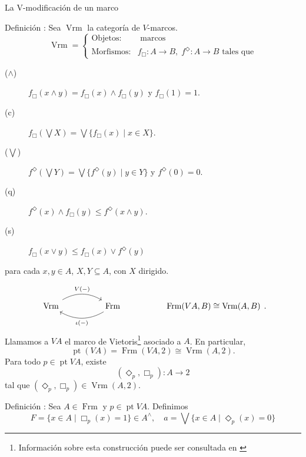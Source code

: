 \documentclass[compress,12pt]{beamer}
\DeclareMathOperator{\pt}{pt}
\DeclareMathOperator{\Vrm}{Vrm}
\DeclareMathOperator{\Frm}{Frm}
\begin{document}
\begin{frame}{La V-modificación de un marco}
\begin{block}{Definición \citep{JohnstoneVietorisMonad}:}
Sea $\Vrm$ la categoría de $V$-marcos. 
\[
\Vrm=
\left\{
\begin{array}{ll}
\text{Objetos:} & \text{ marcos} 
\\[1mm]
\text{Morfismos:} & f_\Box\colon A\to B, \; f^\Diamond\colon A\to B \text{ tales que}
\end{array}
\right.
\]
\begin{description}
\item[($\wedge$)] $f_\Box(x\wedge y)=f_\Box(x)\wedge f_\Box(y)$ y $f_\Box(1)=1$.
\item[(c)] $f_\Box(\bigvee X)=\bigvee\{f_\Box(x)\mid x\in X\}$.
\item[($\bigvee$)] $f^\Diamond(\bigvee Y)=\bigvee\{f^\Diamond(y)\mid y\in Y\}$ y $f^\Diamond(0)=0$.
\item[(q)] $f^\Diamond(x)\wedge f_\Box(y)\leq f^\Diamond(x\wedge y)$.
\item[(s)] $f_\Box(x\vee y)\leq f_\Box(x)\vee f^\Diamond(y)$
\end{description}
para cada $x, y\in A$, $X, Y\subseteq A$, con $X$ dirigido.
\end{block}
\end{frame}

\begin{frame}[fragile]
\[
\begin{tikzcd}
\Vrm \arrow[rr, "V(-)", bend left] &  & \Frm \arrow[ll, "\iota (-)", bend left] &  & {\Frm(VA, B)\cong \Vrm(A, B)}
\end{tikzcd}.
\]
Llamamos a $VA$ el marco de Vietoris\footnote{Información sobre esta construcción puede ser consultada en \cite{JohnstoneVietorisMonad, johnstone2020vietoris, simmons2004vietoris}} asociado a $A$.
En particular,
\[
  \pt(VA)=\Frm(VA, 2)\cong \Vrm(A, 2).
\]
Para todo $p\in \pt VA$, existe 
\[
  (\Diamond_p,\Box_p)\colon A\to 2
\]
tal que $(\Diamond_p,\Box_p)\in \Vrm(A, 2)$.
\end{frame}

\begin{frame}
\begin{block}{Definición \citep{JohnstoneVietorisMonad}:}
Sea $A\in \Frm$ y $p\in \pt VA$. Definimos
\[
F=\{x\in A\mid \Box_p(x)=1\}\in A^\wedge,\quad a=\bigvee\{x\in A\mid \Diamond_p(x)=0\}
\]
\end{block}


\end{frame}
\end{document}
